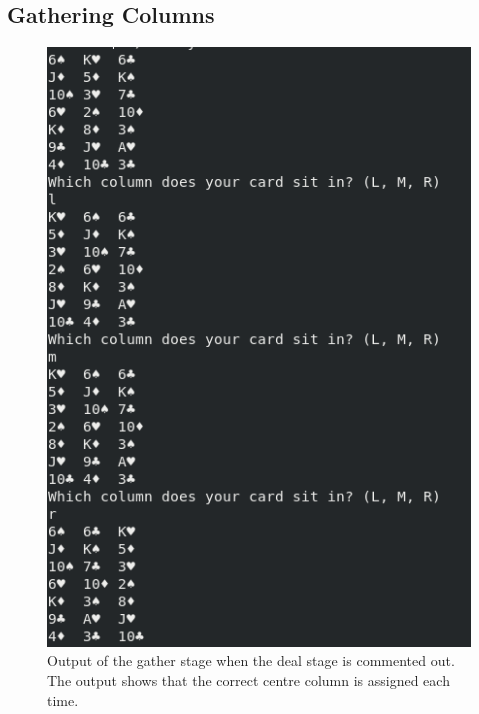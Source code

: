 \documentclass[11]{article}
\begin{document}
			\subsection{Gathering Columns}
				\begin{figure}[h!]
					\caption{Output of the gather stage when the deal stage is commented out. The output shows that the correct centre column is assigned each time.}				\centering
					\includegraphics[scale=0.5]{Gather.png}
				\end{figure}
			
			\clearpage
\end{document}
